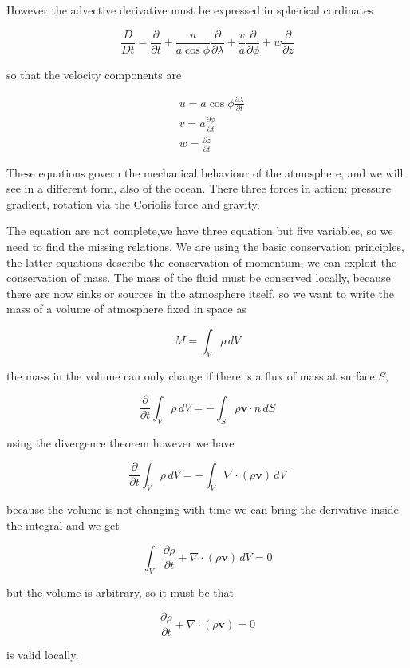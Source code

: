 However the advective derivative must be expressed in spherical cordinates

\[\frac{D }{Dt} = \frac{\partial }{\partial t} + \frac{u}{a\cos{\phi}}\frac{\partial }{\partial \lambda} +\frac{v}{a}\frac{\partial }{\partial \phi} + w\frac{\partial }{\partial z}\]

so that the velocity components are

\[\begin{aligned}
		 & u = a\cos{\phi\frac{\partial \lambda}{\partial t}} \\
		 & v = a \frac{\partial \phi}{\partial t}             \\
		 & w = \frac{\partial z}{\partial t}
	\end{aligned}\]

These equations govern the mechanical behaviour of the atmosphere, and we will see in a different form, also of the ocean. There three forces in action: pressure gradient, rotation via the Coriolis force and gravity.

The equation are not complete,we have three equation but five variables, so we need to find the missing relations. We are using the basic conservation principles, the latter equations describe the conservation
of momentum, we can exploit the conservation of mass. The mass of the fluid must be conserved locally, because there are now sinks or sources in the atmosphere itself, so we want to write the mass of a volume of
atmosphere fixed in space as

\[M = \int_V  \rho \,dV\]

the mass in the volume can only change if there is a flux of mass at surface \(S\),

\[\frac{\partial }{\partial t} \int_V  \rho \,dV = -\int_S \rho\mathbf{v}\cdot n \, dS\]

using the divergence theorem however we have

\[\frac{\partial }{\partial t} \int_V  \rho \,dV = -\int_V \nabla\cdot(\rho\mathbf{v}) \,dV\]

because the volume is not changing with time we can bring the derivative inside the integral and we get

\[\int_V  \frac{\partial \rho}{\partial t}+\nabla\cdot(\rho\mathbf{v}) \,dV = 0\]

but the volume is arbitrary, so it must be that

\[\frac{\partial \rho}{\partial t}+\nabla\cdot(\rho\mathbf{v}) = 0\]

is valid locally.

